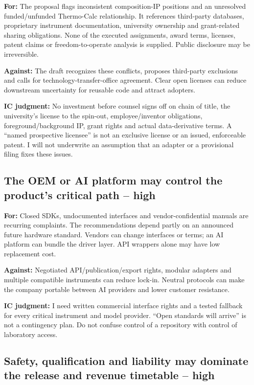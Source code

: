 \textbf{For:} The proposal flags inconsistent composition-IP positions
and an unresolved funded/unfunded Thermo-Calc relationship. It
references third-party databases, proprietary instrument documentation,
university ownership and grant-related sharing obligations. None of the
executed assignments, award terms, licenses, patent claims or
freedom-to-operate analysis is supplied. Public disclosure may be
irreversible. \citep{InputRecommendations,InputProposal}

\textbf{Against:} The draft recognizes these conflicts, proposes
third-party exclusions and calls for technology-transfer-office
agreement. Clear open licenses can reduce downstream uncertainty for
reusable code and attract adopters.

\textbf{IC judgment:} No investment before counsel signs off on chain of
title, the university's license to the spin-out, employee/inventor
obligations, foreground/background IP, grant rights and actual
data-derivative terms. A ``named prospective licensee'' is not an
exclusive license or an issued, enforceable patent. I will not
underwrite an assumption that an adapter or a provisional filing fixes
these issues.

\subsection{The OEM or AI platform may control the product's critical
path --
high}\label{the-oem-or-ai-platform-may-control-the-products-critical-path-high}

\textbf{For:} Closed SDKs, undocumented interfaces and
vendor-confidential manuals are recurring complaints. The
recommendations depend partly on an announced future hardware standard.
Vendors can change interfaces or terms; an AI platform can bundle the
driver layer. API wrappers alone may have low replacement cost.
\citep{InputBrief,InputRecommendations}

\textbf{Against:} Negotiated API/publication/export rights, modular
adapters and multiple compatible instruments can reduce lock-in. Neutral
protocols can make the company portable between AI providers and lower
customer resistance.

\textbf{IC judgment:} I need written commercial interface rights and a
tested fallback for every critical instrument and model provider. ``Open
standards will arrive'' is not a contingency plan. Do not confuse
control of a repository with control of laboratory access.

\subsection{Safety, qualification and liability may dominate the release
and revenue timetable --
high}\label{safety-qualification-and-liability-may-dominate-the-release-and-revenue-timetable-high}

